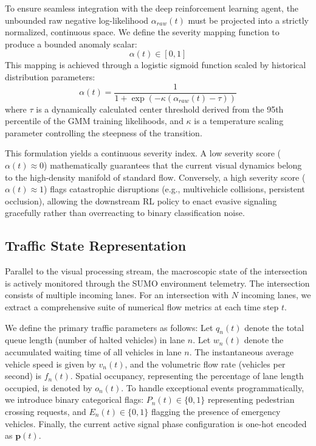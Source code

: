 \documentclass[conference]{IEEEtran}
\begin{document}
To ensure seamless integration with the deep reinforcement learning agent, the unbounded raw negative log-likelihood $\alpha_{raw}(t)$ must be projected into a strictly normalized, continuous space. We define the severity mapping function to produce a bounded anomaly scalar:
\begin{equation}
\alpha(t) \in [0, 1]
\label{eq:alpha_bounds}
\end{equation}
This mapping is achieved through a logistic sigmoid function scaled by historical distribution parameters:
\begin{equation}
\alpha(t) = \frac{1}{1 + \exp\left(-\kappa (\alpha_{raw}(t) - \tau)\right)}
\label{eq:anomaly_sigmoid}
\end{equation}
where $\tau$ is a dynamically calculated center threshold derived from the 95th percentile of the GMM training likelihoods, and $\kappa$ is a temperature scaling parameter controlling the steepness of the transition. 

This formulation yields a continuous severity index. A low severity score ($\alpha(t) \approx 0$) mathematically guarantees that the current visual dynamics belong to the high-density manifold of standard flow. Conversely, a high severity score ($\alpha(t) \approx 1$) flags catastrophic disruptions (e.g., multivehicle collisions, persistent occlusion), allowing the downstream RL policy to enact evasive signaling gracefully rather than overreacting to binary classification noise.

\subsection{Traffic State Representation}
\label{subsec:traffic_state}

Parallel to the visual processing stream, the macroscopic state of the intersection is actively monitored through the SUMO environment telemetry. The intersection consists of multiple incoming lanes. For an intersection with $N$ incoming lanes, we extract a comprehensive suite of numerical flow metrics at each time step $t$.

We define the primary traffic parameters as follows:
Let $q_n(t)$ denote the total queue length (number of halted vehicles) in lane $n$. Let $w_n(t)$ denote the accumulated waiting time of all vehicles in lane $n$. The instantaneous average vehicle speed is given by $v_n(t)$, and the volumetric flow rate (vehicles per second) is $f_n(t)$. Spatial occupancy, representing the percentage of lane length occupied, is denoted by $o_n(t)$. To handle exceptional events programmatically, we introduce binary categorical flags: $P_n(t) \in \{0, 1\}$ representing pedestrian crossing requests, and $E_n(t) \in \{0, 1\}$ flagging the presence of emergency vehicles. Finally, the current active signal phase configuration is one-hot encoded as $\mathbf{p}(t)$.
\end{document}
